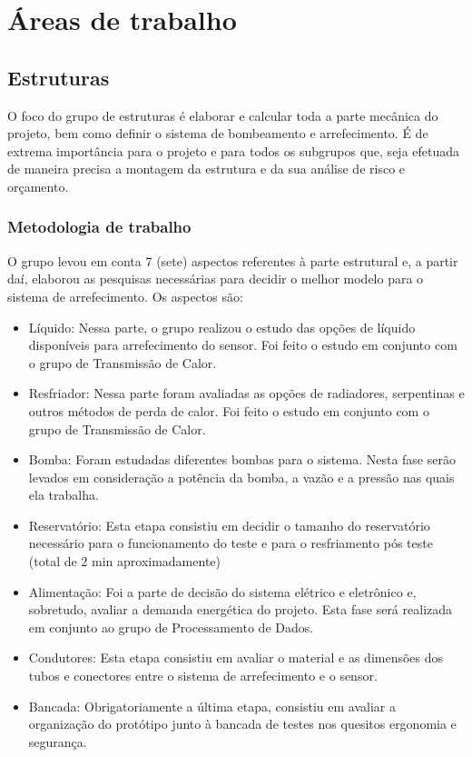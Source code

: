 \chapter{Áreas de trabalho}

\section{Estruturas}

O foco do grupo de estruturas é elaborar e calcular toda a parte mecânica do projeto, bem como definir o sistema de bombeamento e arrefecimento. É de extrema importância para o projeto e para todos os subgrupos que, seja efetuada de maneira precisa a montagem da estrutura e da sua análise de risco e orçamento.

\subsection{Metodologia de trabalho}

O grupo levou em conta 7 (sete) aspectos referentes à parte estrutural e, a partir daí, elaborou as pesquisas necessárias para decidir o melhor modelo para o sistema de arrefecimento. Os aspectos são:

\begin{itemize}
\item	Líquido: Nessa parte, o grupo realizou o estudo das opções de líquido disponíveis para arrefecimento do sensor. Foi feito o estudo em conjunto com o grupo de Transmissão de Calor.
\item	Resfriador: Nessa parte foram avaliadas as opções de radiadores, serpentinas e outros métodos de perda de calor. Foi feito o estudo em conjunto com o grupo de Transmissão de Calor.
\item	Bomba: Foram estudadas diferentes bombas para o sistema. Nesta fase serão levados em consideração a potência da bomba, a vazão e a pressão nas quais ela trabalha.
\item Reservatório: Esta etapa consistiu em decidir o tamanho do reservatório necessário para o funcionamento do teste e para o resfriamento pós teste (total de 2 min aproximadamente)
\item	Alimentação: Foi a parte de decisão do sistema elétrico e eletrônico e, sobretudo, avaliar a demanda energética do projeto. Esta fase será realizada em conjunto ao grupo de Processamento de Dados.
\item	Condutores: Esta etapa consistiu em avaliar o material e as dimensões dos tubos e conectores entre o sistema de arrefecimento e o sensor.
\item	Bancada: Obrigatoriamente a última etapa, consistiu em avaliar a organização do protótipo junto à bancada de testes nos quesitos ergonomia e segurança.
\end{itemize}

